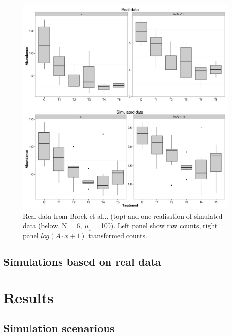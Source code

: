 \documentclass{scrartcl}\usepackage[]{graphicx}\usepackage[]{color}
\begin{document}
\begin{figure}
  \includegraphics[width = \textwidth]{p4_1.pdf}
  \caption{Real data from Brock et al... (top) and one realisation of simulated data (below, N = 6, $\mu_c$ = 100). Left panel show raw counts, right panel $log(A \cdot x + 1)$ transformed counts.}
  \label{fig:p4_1}
\end{figure}

\subsection{Simulations based on real data}

\section{Results}
\subsection{Simulation scenarious}
\end{document}
